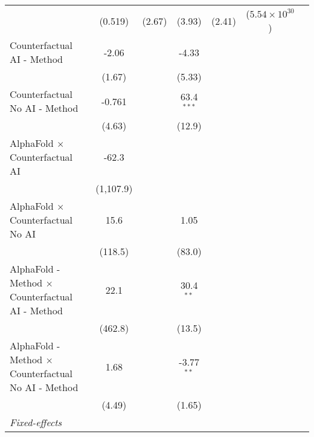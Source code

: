 \begin{tabular}{lcccccc}
                                                              & (0.519)     & (2.67) & (3.93)       & (2.41)       & ($5.54\times 10^{30}$)         &   \\   
   Counterfactual AI - Method                                 & -2.06       &        & -4.33        &              &                                &   \\   
                                                              & (1.67)      &        & (5.33)       &              &                                &   \\   
   Counterfactual No AI - Method                              & -0.761      &        & 63.4$^{***}$ &              &                                &   \\   
                                                              & (4.63)      &        & (12.9)       &              &                                &   \\   
   AlphaFold $\times$ Counterfactual AI                       & -62.3       &        &              &              &                                &   \\   
                                                              & (1,107.9)   &        &              &              &                                &   \\   
   AlphaFold $\times$ Counterfactual No AI                    & 15.6        &        & 1.05         &              &                                &   \\   
                                                              & (118.5)     &        & (83.0)       &              &                                &   \\   
   AlphaFold - Method $\times$ Counterfactual AI - Method     & 22.1        &        & 30.4$^{**}$  &              &                                &   \\   
                                                              & (462.8)     &        & (13.5)       &              &                                &   \\   
   AlphaFold - Method $\times$ Counterfactual No AI - Method  & 1.68        &        & -3.77$^{**}$ &              &                                &   \\   
                                                              & (4.49)      &        & (1.65)       &              &                                &   \\   
   \midrule
   \emph{Fixed-effects}\\

\end{tabular}
